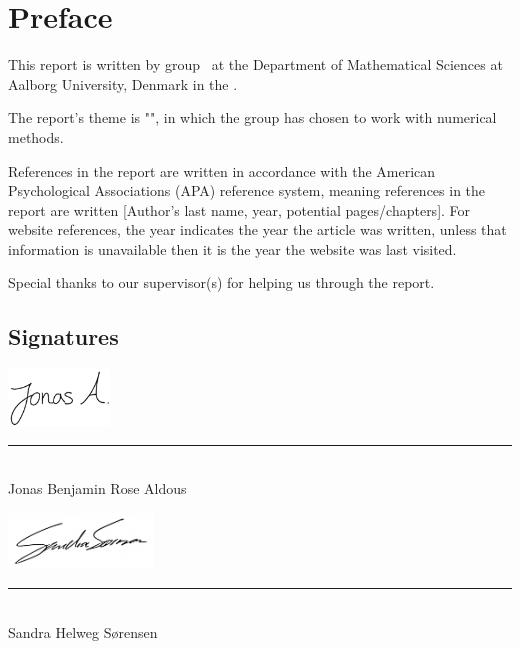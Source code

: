\chapter*{Preface}\label{Preface}
This report is written by group \projectgroup\, at the Department of Mathematical Sciences at Aalborg University, Denmark in the \MakeLowercase{\projectperiod}.

The report's theme is "\projecttheme", in which the group has chosen to work with numerical methods.

References in the report are written in accordance with the American Psychological Associations (APA) reference system, meaning references in the report are written [Author's last name, year, potential pages/chapters]. For website references, the year indicates the year the article was written, unless that information is unavailable then it is the year the website was last visited.

Special thanks to our supervisor(s) for helping us through the report.


\section*{Signatures}
\begingroup\centering\vfill\noindent
\begin{minipage}[b]{0.45\textwidth}
 \centering
 \includegraphics[height=1.5cm]{Include/Frontmatter/Signatures/Jonas.PNG}
 \textcolor{AAUgrey1}{\rule{\textwidth}{0.75pt}}\\
 Jonas Benjamin Rose Aldous\\
 {\footnotesize {}}
\end{minipage}
\hfill
\begin{minipage}[b]{0.45\textwidth}
 \centering
 \includegraphics[height=1.5cm]{Include/Frontmatter/Signatures/Sandra.png}
 \textcolor{AAUgrey1}{\rule{\textwidth}{0.75pt}}\\
  Sandra Helweg Sørensen\\
 {\footnotesize {}}
\end{minipage}

\vfill\vfill\noindent\endgroup